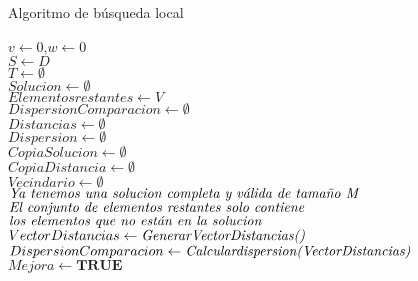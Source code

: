 \documentclass[a4paper,10pt]{article}
\begin{document}
\begin{algorithm}[H]
    \scriptsize
    \label{Algoritmo Busqueda Local}
    \caption{Algoritmo de búsqueda local}
    $v \leftarrow 0 $,$ w\leftarrow 0 $\\
    $ S\leftarrow D $\\
    $T \leftarrow \emptyset $\\
  $Solucion \leftarrow \emptyset$\\
  $Elementos restantes \leftarrow V$\\
  $Dispersion Comparacion \leftarrow \emptyset$\\
  $Distancias \leftarrow \emptyset$\\
  $Dispersion \leftarrow \emptyset$\\
  \vspace{3mm}
  $Copia Solucion \leftarrow \emptyset$\\
  $Copia Distancia \leftarrow \emptyset$\\
  $Vecindario \leftarrow \emptyset$\\
  \vspace{3mm}
  $\emph{Ya tenemos una solucion completa y válida de tamaño M}$\\
  $\emph{El conjunto de elementos restantes solo contiene}$\\
  $\emph{los elementos que no están en la solucion}$\\
  \vspace{3mm}
  $Vector Distancias \leftarrow{\emph{GenerarVectorDistancias()}}$\\
  $Dispersion Comparacion \leftarrow{\emph{Calculardispersion(VectorDistancias)}}$\\
  \vspace{3mm}
  $Mejora \leftarrow {\textbf{TRUE}}$\\


\end{algorithm}
\end{document}
